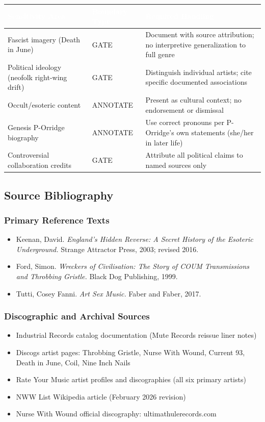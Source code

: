 \documentclass[11pt,letterpaper]{article}
\newcommand{\tableheader}[1]{\textbf{\sffamily\textcolor{white}{#1}}}
\begin{document}
\begin{center}
\begin{tabularx}{\textwidth}{L{3cm}L{2.5cm}X}
\toprule
{}
\tableheader{Sensitivity Area} & \tableheader{Boundary Type} & \tableheader{Required Handling} \\
\midrule
Fascist imagery (Death in June) & GATE & Document with source attribution; no interpretive generalization to full genre \\
Political ideology (neofolk right-wing drift) & GATE & Distinguish individual artists; cite specific documented associations \\
Occult/esoteric content & ANNOTATE & Present as cultural context; no endorsement or dismissal \\
Genesis P-Orridge biography & ANNOTATE & Use correct pronouns per P-Orridge's own statements (she/her in later life) \\
Controversial collaboration credits & GATE & Attribute all political claims to named sources only \\
\bottomrule
\end{tabularx}
\end{center}

\subsection{Source Bibliography}

\subsubsection{Primary Reference Texts}
\begin{itemize}[noitemsep]
  \item Keenan, David. \textit{England's Hidden Reverse: A Secret History of the Esoteric Underground.} Strange Attractor Press, 2003; revised 2016.
  \item Ford, Simon. \textit{Wreckers of Civilisation: The Story of COUM Transmissions and Throbbing Gristle.} Black Dog Publishing, 1999.
  \item Tutti, Cosey Fanni. \textit{Art Sex Music.} Faber and Faber, 2017.
\end{itemize}

\subsubsection{Discographic and Archival Sources}
\begin{itemize}[noitemsep]
  \item Industrial Records catalog documentation (Mute Records reissue liner notes)
  \item Discogs artist pages: Throbbing Gristle, Nurse With Wound, Current 93, Death in June, Coil, Nine Inch Nails
  \item Rate Your Music artist profiles and discographies (all six primary artists)
  \item NWW List Wikipedia article (February 2026 revision)
  \item Nurse With Wound official discography: ultimathulerecords.com
\end{itemize}
\end{document}
